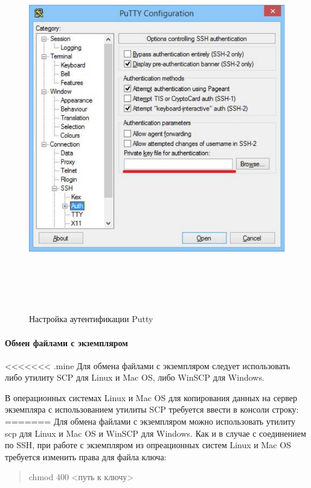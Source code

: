 \documentclass[12pt,twoside]{article}
\begin{document}
\begin{figure}[tb!]
  \centering
      \includegraphics[height=16cm]{putty.pdf}
  \caption{Настройка аутентификации Putty}
  \label{fig:putty}
\end{figure}

\paragraph{Обмен файлами с экземпляром}
<<<<<<< .mine
Для обмена файлами с экземпляром следует использовать либо утилиту SCP для Linux и Mac OS, либо WinSCP для Windows.

В операционных системах Linux и Mac OS для копирования данных  на сервер экземпляра с использованием утилиты SCP требуется ввести в консоли строку:
=======
Для обмена файлами с экземпляром можно использовать утилиту scp для Linux и Mac OS и WinSCP для Windows. Как и в случае с соединением по SSH, при работе с экземпляром из опреационных систем Linux и Mac OS требуется изменить права для файла ключа:
\begin{quote}
chmod 400 <путь к ключу>
\end{quote}
\end{document}
